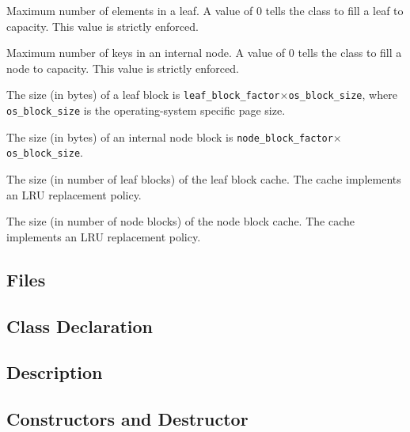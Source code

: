    {Maximum number of elements in a leaf. A
  value of $0$ tells the class to fill a leaf to capacity. This value is
  strictly enforced.}

   {Maximum number of keys in an internal
  node. A value of $0$ tells the class to fill a node to capacity. This
  value is strictly enforced.}

   {The size (in bytes) of a leaf block
  is \lstinline|leaf_block_factor|$\times$\lstinline|os_block_size|, where \lstinline|os_block_size| is the operating-system specific page size.}

   {The size (in bytes) of an internal
  node block is \lstinline|node_block_factor|$\times$\lstinline|os_block_size|.}

   {The size (in number of leaf blocks) of
  the leaf block cache. The cache implements an LRU replacement policy.}

   {The size (in number of node blocks) of
  the node block cache. The cache implements an LRU replacement policy.}

\etabb
{}

\clearpage

\subsection{Files}
   \btabb
       {}
   \etabb

\subsection{Class Declaration}
   \btabb
       {}
   \etabb

\subsection{Description}

\subsection{Constructors and Destructor}
   \btabb
   \etabb

